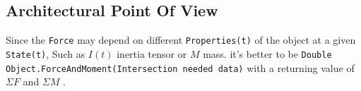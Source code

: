 \documentclass[a4paper]{report}
\begin{document}
\subsection{Architectural Point Of View}
Since the \verb+Force+ may depend on different \verb+Properties(t)+ of the object at a given \verb+State(t)+,
Such as $I(t)$ inertia tensor or $M$ mass. it's better to be  \verb+Double Object.ForceAndMoment(Intersection needed data)+ with a returning value of $ \Sigma F $ and $ \Sigma M $ .


\end{document}
